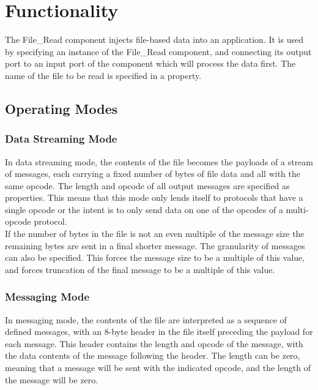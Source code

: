 \def\name{\comp}
\def\workertype{Application}
\def\version{\ocpiversion}
\def\releasedate{04/2019}
\def\componentlibrary{ocpi.core}
\def\workers{\comp{}.hdl, \comp{}.rcc}
\def\testedplatforms{centos7, isim, modelsim, xilinx13\_{}3, xilinx13\_{}4, xsim}


\section*{Functionality}
\begin{flushleft}
The File\_Read component injects file-based data into an application. It is used
by specifying an instance of the File\_Read component, and connecting its output port to
an input port of the component which will process the data first. The name of the file to
be read is specified in a property.
\subsection*{Operating Modes}
\subsubsection*{Data Streaming Mode}
In data streaming mode, the contents of the file becomes the payloads of a stream of
messages, each carrying a fixed number of bytes of file data and all with
the same opcode. The length and opcode of all output messages are specified as
properties. This means that this mode only lends itself to protocols that have a single opcode or the intent is to only send data on one of the opcodes of a multi-opcode protocol.\\ \medskip \medskip
If the number of bytes in the file is not an even multiple of the message size the
remaining bytes are sent in a final shorter message. The granularity of messages can
also be specified. This forces the message size to be a multiple of this value, and
forces truncation of the final message to be a multiple of this value.
\newpage
\subsubsection*{Messaging Mode}
In messaging mode, the contents of the file are interpreted as a sequence of defined
messages, with an 8-byte header in the file itself preceding the payload for each message.
This header contains the length and opcode of the message, with the data contents of
the message following the header. The length can be zero, meaning that a message
will be sent with the indicated opcode, and the length of the message will be zero.\\
\medskip \medskip


\end{flushleft}
